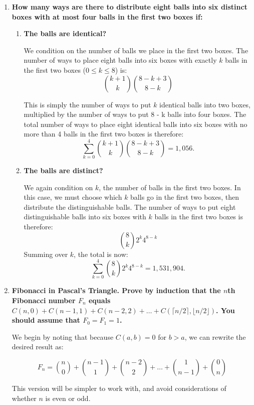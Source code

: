 \documentclass[12pt]{amsart}
\begin{document}
\begin{enumerate}
\begin{enumerate}
\end{enumerate}

\medskip

\item {\bf How many ways are there to distribute eight balls into six distinct boxes with at most four balls in the first two boxes if:}
\begin{enumerate}
\item {\bf The balls are identical?}

We condition on the number of balls we place in the first two boxes.
The number of ways to place eight balls into six boxes with exactly
$k$ balls in the first two boxes ($0 \leq k \leq 8$) is:
$$
{k + 1 \choose k}{8 - k + 3 \choose 8-k}
$$

This is simply the number of ways to put $k$ identical balls into
two boxes, multiplied by the number of ways to put 8 - k balls
into four boxes.  The total number of ways to place eight
identical balls into six boxes with no more than 4 balls in the
first two boxes is therefore:
$$
\sum_{k=0}^4 {k+1 \choose k}{8 - k + 3 \choose 8-k} = 1,056.
$$
\item {\bf The balls are distinct?}

We again condition on $k$, the number of balls in the first two
boxes.  In this case, we must choose which $k$ balls go in the
first two boxes, then distribute the distinguishable balls.  The
number of ways to put eight distinguishable balls into six boxes
with $k$ balls in the first two boxes is therefore:
$$
{8 \choose k}2^k 4^{8-k}
$$
Summing over $k$, the total is now:
$$
\sum_{k=0}^4 {8 \choose k}2^k 4^{8-k} = 1,531,904.
$$

\end{enumerate}

\medskip

\item {\bf Fibonacci in Pascal's Triangle.  Prove by induction that the $n$th Fibonacci number $F_n$ equals $C(n,0) + C(n-1,1) + C(n-2,2) + \ldots + C(\lceil n/2 \rceil, \lfloor n/2 \rfloor)$.  You should assume that $F_0 = F_1 = 1$.}

We begin by noting that because $C(a,b) = 0$ for $b > a$, we can
rewrite the desired result as:

$$
F_n = {n \choose 0} + {n-1 \choose 1} + {n-2 \choose 2} + \ldots + {1 \choose n-1} + {0 \choose n}
$$

This version will be simpler to work with, and avoid considerations of
whether $n$ is even or odd.


\end{enumerate}
\end{document}
